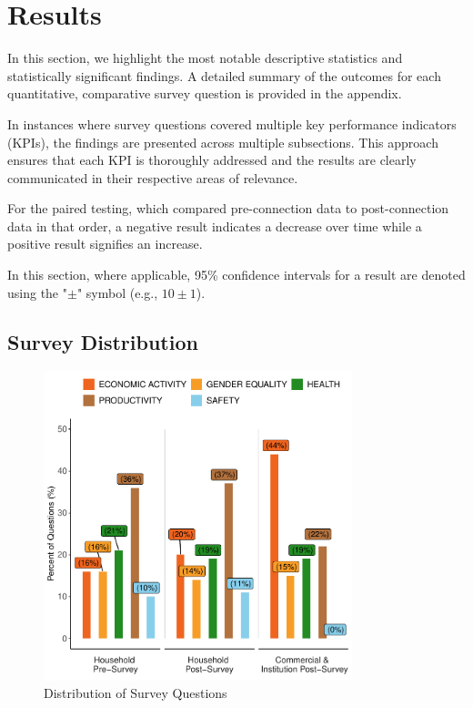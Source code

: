 \section{Results}
\label{sec:results}
In this section, we highlight the most notable descriptive statistics and statistically significant findings. A detailed summary of the outcomes for each quantitative, comparative survey question is provided in the appendix.

In instances where survey questions covered multiple key performance indicators (KPIs), the findings are presented across multiple subsections. This approach ensures that each KPI is thoroughly addressed and the results are clearly communicated in their respective areas of relevance.

For the paired testing, which compared pre-connection data to post-connection data in that order, a negative result indicates a decrease over time while a positive result signifies an increase. 

In this section, where applicable, 95\% confidence intervals for a result are denoted using the "$\pm$" symbol (e.g., $10\pm1$).

\subsection{Survey Distribution}
\begin{figure}[th]
	\centering
	\includegraphics[width=0.8\textwidth]{images/questions_distribution_plot.pdf}
	\caption{Distribution of Survey Questions}
	\label{fig:distrbution_questions}
\end{figure}

